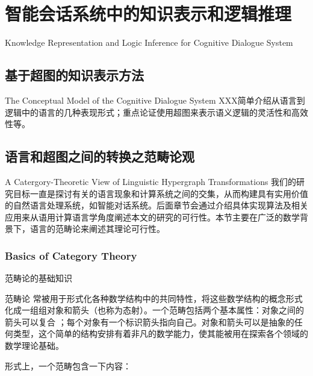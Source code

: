 \chapter{智能会话系统中的知识表示和逻辑推理}{Knowledge Representation and Logic Inference for Cognitive Dialogue System}

\section{基于超图的知识表示方法}{The Conceptual Model of the Cognitive Dialogue System}
XXX简单介绍从语言到逻辑中的语言的几种表现形式；重点论证使用超图来表示语义逻辑的灵活性和高效性等。




\section{语言和超图之间的转换之范畴论观}{A Catergory-Theoretic View of Linguistic Hypergraph Transformations}
我们的研究目标一直是探讨有关的语言现象和计算系统之间的交集，从而构建具有实用价值的自然语言处理系统，如智能对话系统。后面章节会通过介绍具体实现算法及相关应用来从语用计算语言学角度阐述本文的研究的可行性。本节主要在广泛的数学背景下，语言的范畴论来阐述其理论可行性。

\subsection{Basics of Category Theory}{范畴论的基础知识}

范畴论 \cite{LawvereSchanuel97}常被用于形式化各种数学结构中的共同特性，将这些数学结构的概念形式化成一组组对象和箭头（也称为态射）。一个范畴包括两个基本属性：对象之间的箭头可以复合 ；每个对象有一个标识箭头指向自己。对象和箭头可以是抽象的任何类型，这个简单的结构安排有着非凡的数学能力，使其能被用在探索各个领域的数学理论基础。

形式上，一个范畴包含一下内容：

